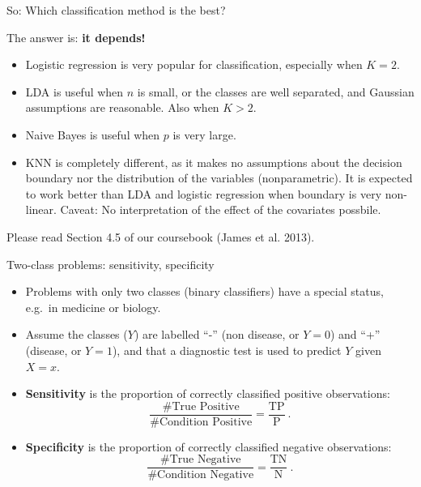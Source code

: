 \documentclass[10pt,ignorenonframetext,]{beamer}
\begin{document}
\begin{frame}

\begin{block}{So: Which classification method is the best?}

\vspace{2mm}

The answer is: \textbf{it depends!}

\begin{itemize}
\item
  Logistic regression is very popular for classification, especially
  when \(K = 2\).
\item
  LDA is useful when \(n\) is small, or the classes are well separated,
  and Gaussian assumptions are reasonable. Also when \(K > 2\).
\item
  Naive Bayes is useful when \(p\) is very large.
\item
  KNN is completely different, as it makes no assumptions about the
  decision boundary nor the distribution of the variables
  (nonparametric). It is expected to work better than LDA and logistic
  regression when boundary is very non-linear. Caveat: No interpretation
  of the effect of the covariates possbile.
\end{itemize}

\vspace{2mm} Please read Section 4.5 of our coursebook (James et al.
2013).

\end{block}

\end{frame}

\begin{frame}{Two-class problems: sensitivity, specificity}

\begin{itemize}
\item
  Problems with only two classes (binary classifiers) have a special
  status, e.g.~in medicine or biology.
\item
  Assume the classes (\(Y\)) are labelled ``-'' (non disease, or
  \(Y=0\)) and ``+'' (disease, or \(Y=1\)), and that a diagnostic test
  is used to predict \(Y\) given \(X=x\).
\item
  \textbf{Sensitivity} is the proportion of correctly classified
  positive observations:
  \[\frac{\# \text{True Positive}}{\# \text{Condition Positive}}=\frac{\text{TP}}{\text{P}} \ .\]
\item
  \textbf{Specificity} is the proportion of correctly classified
  negative observations:
  \[\frac{\# \text{True Negative}}{\# \text{Condition Negative}}=\frac{\text{TN}}{\text{N}} \ .\]
\end{itemize}

\end{frame}
\end{document}
